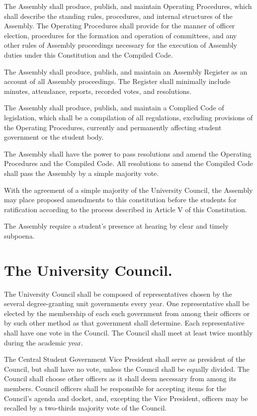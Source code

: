     The Assembly shall produce, publish, and maintain Operating Procedures, which shall describe the standing rules, procedures, and internal structures of the Assembly. The Operating Procedures shall provide for the manner of officer election, procedures for the formation and operation of committees, and any other rules of Assembly proceedings necessary for the execution of Assembly duties under this Constitution and the Compiled Code.

    The Assembly shall produce, publish, and maintain an Assembly Register as an account of all Assembly proceedings. The Register shall minimally include minutes, attendance, reports, recorded votes, and resolutions.

    The Assembly shall produce, publish, and maintain a Complied Code of legislation, which shall be a compilation of all regulations, excluding provisions of the Operating Procedures, currently and permanently affecting student government or the student body.

     The Assembly shall have the power to pass resolutions and amend the Operating Procedures and the Compiled Code. All resolutions to amend the Compiled Code shall pass the Assembly by a simple majority vote.

     With the agreement of a simple majority of the University Council, the Assembly may place proposed amendments to this constitution before the students for ratification according to the process described in Article V of this Constitution.

    The Assembly require a student's presence at hearing by clear and timely subpoena.

\section{The University Council.}
    The University Council shall be composed of representatives chosen by the several degree-granting unit governments every year. One representative shall be elected by the membership of each such government from among their officers or by such other method as that government shall determine. Each representative shall have one vote in the Council. The Council shall meet at least twice monthly during the academic year.

    The Central Student Government Vice President shall serve as president of the Council, but shall have no vote, unless the Council shall be equally divided. The Council shall choose other officers as it shall deem necessary from among its members. Council officers shall be responsible for accepting items for the Council's agenda and docket, and, excepting the Vice President, officers may be recalled by a two-thirds majority vote of the Council.
 
